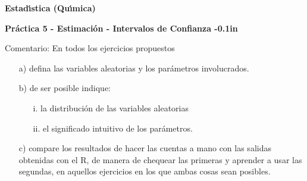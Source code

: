 \documentclass[11pt,a4paper,twoside]{article}%
\begin{document}
\begin{center}
\textbf{\textsf{Estad\'{\i}stica (Qu\'{\i}mica) }}

\textbf{Pr\'{a}ctica 5 - Estimaci\'{o}n - Intervalos de Confianza\vspace
{-0.1in}}
\end{center}

Comentario: En todos los ejercicios propuestos

\begin{enumerate}
\item[a)] defina las variables aleatorias y los par\'{a}metros involucrados.

\item[b)] de ser posible indique:

\begin{enumerate}
\item[i.] la distribuci\'{o}n de las variables aleatorias

\item[ii.] el significado intuitivo de los par\'{a}metros.
\end{enumerate}

\item[c)] compare los resultados de hacer las cuentas a mano con las salidas
obtenidas con el R, de manera de chequear las primeras y aprender a usar las
segundas, en aquellos ejercicios en los que ambas cosas sean posibles.
\end{enumerate}
\end{document}
